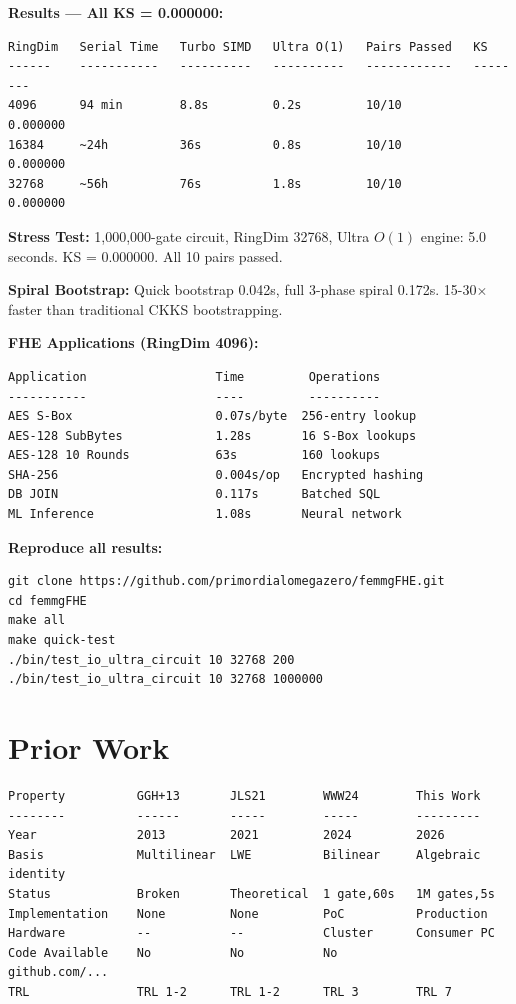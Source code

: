 \documentclass[11pt,a4paper]{article}
\begin{document}
\textbf{Results --- All KS = 0.000000:}

\begin{verbatim}
RingDim   Serial Time   Turbo SIMD   Ultra O(1)   Pairs Passed   KS
------    -----------   ----------   ----------   ------------   --------
4096      94 min        8.8s         0.2s         10/10          0.000000
16384     ~24h          36s          0.8s         10/10          0.000000
32768     ~56h          76s          1.8s         10/10          0.000000
\end{verbatim}

\textbf{Stress Test:} 1,000,000-gate circuit, RingDim 32768, Ultra $O(1)$ engine: 5.0 seconds. KS = 0.000000. All 10 pairs passed.

\textbf{Spiral Bootstrap:} Quick bootstrap 0.042s, full 3-phase spiral 0.172s. 15-30$\times$ faster than traditional CKKS bootstrapping.

\textbf{FHE Applications (RingDim 4096):}

\begin{verbatim}
Application                  Time         Operations
-----------                  ----         ----------
AES S-Box                    0.07s/byte  256-entry lookup
AES-128 SubBytes             1.28s       16 S-Box lookups
AES-128 10 Rounds            63s         160 lookups
SHA-256                      0.004s/op   Encrypted hashing
DB JOIN                      0.117s      Batched SQL
ML Inference                 1.08s       Neural network
\end{verbatim}

\textbf{Reproduce all results:}
\begin{verbatim}
git clone https://github.com/primordialomegazero/femmgFHE.git
cd femmgFHE
make all
make quick-test
./bin/test_io_ultra_circuit 10 32768 200
./bin/test_io_ultra_circuit 10 32768 1000000
\end{verbatim}

\section{Prior Work}

\begin{verbatim}
Property          GGH+13       JLS21        WWW24        This Work
--------          ------       -----        -----        ---------
Year              2013         2021         2024         2026
Basis             Multilinear  LWE          Bilinear     Algebraic identity
Status            Broken       Theoretical  1 gate,60s   1M gates,5s
Implementation    None         None         PoC          Production
Hardware          --           --           Cluster      Consumer PC
Code Available    No           No           No           github.com/...
TRL               TRL 1-2      TRL 1-2      TRL 3        TRL 7
\end{verbatim}
\end{document}

